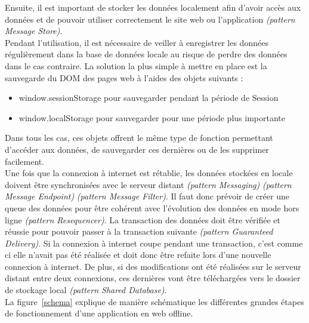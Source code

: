 	Ensuite, il est important de stocker les données localement afin d’avoir accès aux données et de pouvoir utiliser correctement le site web ou l’application \textit{(pattern Message Store)}. \\

	Pendant l’utilisation, il est nécessaire de veiller à enregistrer les données régulièrement dans la base de données locale au risque de perdre des données dans le cas contraire. La solution la plus simple à mettre en place est la sauvegarde du DOM des pages web à l’aides des objets suivants :

	\begin{itemize}
		\item window.sessionStorage pour sauvegarder pendant la période de Session
		\item window.localStorage pour sauvegarder pour une période plus importante
	\end{itemize}

	Dans tous les cas, ces objets offrent le même type de fonction permettant d'accéder aux données, de sauvegarder ces dernières ou de les supprimer facilement.\\

	Une fois que la connexion à internet est rétablie, les données stockées en locale doivent être synchronisées avec le serveur distant \textit{(pattern Messaging)} \textit{(pattern Message Endpoint)} \textit{(pattern Message Filter)}. Il faut donc prévoir de créer une queue des données pour être cohérent avec l’évolution des données en mode hors ligne \textit{(pattern Resequencer)}. La transaction des données doit être vérifiée et réussie pour pouvoir passer à la transaction suivante \textit{(pattern Guaranteed Delivery)}. Si la connexion à internet coupe pendant une transaction, c’est comme ci elle n’avait pas été réalisée et doit donc être refaite lors d’une nouvelle connexion à internet. De plus, si des modifications ont été réalisées sur le serveur distant entre deux connexions, ces dernières vont être téléchargées vers le dossier de stockage local \textit{(pattern Shared Database)}.\\

La figure~\ref{schema} explique de manière schématique les différentes grandes étapes de fonctionnement d'une application en web offline.

